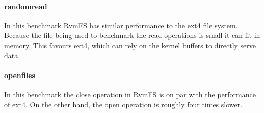 \paragraph{\bf randomread} 
In this benchmark RvmFS has similar performance to the ext4 file system. Because the file being used to benchmark the read operations is small it can fit in memory. This favours ext4, 
which can rely on the kernel buffers to directly serve data.
\paragraph{\bf openfiles} 
In this benchmark the close operation in RvmFS is on par with the performance of ext4. On the other hand, the open operation is roughly four times slower.






%
